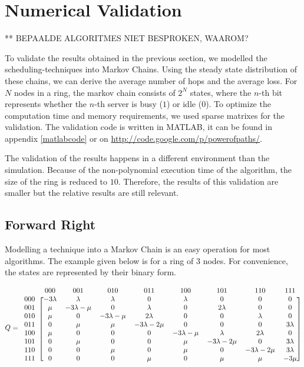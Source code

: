 \documentclass[10pt,a4paper]{article}
\begin{document}
\section{Numerical Validation}
** BEPAALDE ALGORITMES NIET BESPROKEN, WAAROM?

\label{secvalidation}

To validate the results obtained in the previous section, we modelled the scheduling-techniques into Markov Chains. Using the steady state distribution of these chains, we can derive the average number of hops and the average loss.
For $N$ nodes in a ring, the markov chain consists of $2^N$ states, where the $n$-th bit represents whether the $n$-th server is busy ($1$) or idle ($0$). To optimize the computation time and memory requirements, we used sparse matrixes for the validation. The validation code is written in MATLAB, it can be found in appendix \ref{matlabcode} or on \url{http://code.google.com/p/powerofpaths/}.

The validation of the results happens in a different environment than the simulation. Because of the non-polynomial execution time of the algorithm, the size of the ring is reduced to $10$. Therefore, the results of this validation are smaller but the relative results are still relevant.

\subsection{Forward Right}
\label{validateright}
Modelling a technique into a Markov Chain is an easy operation for most algorithms. The example given below is for a ring of 3 nodes. For convenience, the states are represented by their binary form.

\[ Q =
  \begin{blockarray}{ccccccccc}
    & 000 & 001 & 010 & 011 & 100 & 101 & 110 & 111 \\
    \begin{block}{c[cccccccc]}
    000 & -3 \lambda & \lambda & \lambda & 0 & \lambda & 0 & 0 & 0 \\
    001 & \mu & -3\lambda-\mu & 0 & \lambda & 0 & 2\lambda & 0 & 0 \\
    010 & \mu & 0 & -3\lambda-\mu & 2\lambda & 0 & 0 & \lambda & 0 \\
    011 & 0 & \mu & \mu & -3\lambda-2\mu & 0 & 0 & 0 & 3\lambda \\
    100 & \mu & 0 & 0 & 0 & -3\lambda-\mu & \lambda & 2\lambda & 0 \\
    101 & 0 & \mu & 0 & 0 & \mu & -3\lambda-2\mu & 0 & 3\lambda \\
    110 & 0 & 0 & \mu & 0 & \mu & 0 & -3\lambda-2\mu & 3\lambda \\
    111 & 0 & 0 & 0 & \mu & 0 & \mu & \mu & -3\mu \\
    \end{block}
  \end{blockarray}
\]
\end{document}
